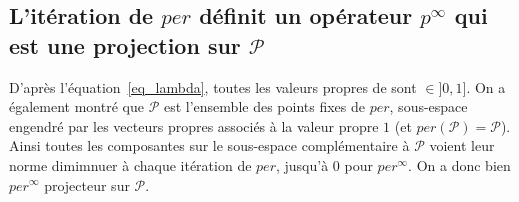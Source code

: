 \documentclass[12pt,a4paper,onecolumn]{article}
\begin{document}
\subsection{L'itération de \(per\) définit un opérateur \(p^{\infty}\) qui est une projection sur \(\mathcal{P}\)}

D'après l'équation~\eqref{eq_lambda}, toutes les valeurs propres de sont \(\in ]0, 1]\). On a également montré que \(\mathcal{P}\) est l'ensemble des points fixes de \(per\), sous-espace engendré par les vecteurs propres associés à la valeur propre \(1\) (et \(per(\mathcal{P}) = \mathcal{P}\)). Ainsi toutes les composantes sur le sous-espace complémentaire à \(\mathcal{P}\) voient leur norme dimimnuer à chaque itération de \(per\), jusqu'à 0 pour \(per^{\infty}\). On a donc bien \(per^{\infty}\) projecteur sur \(\mathcal{P}\).
\end{document}

